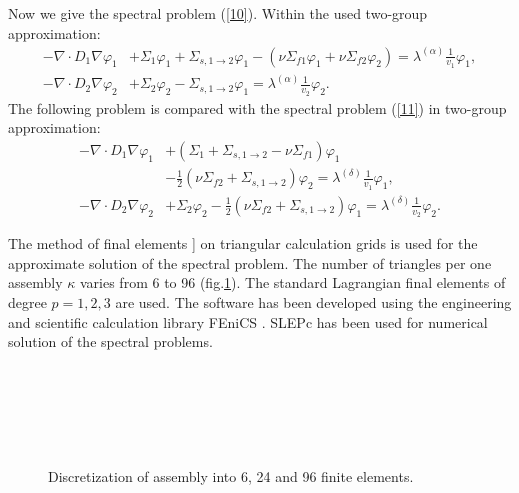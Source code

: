 \documentclass[authoryear]{elsarticle}
\begin{document}
Now we give the  spectral problem (\ref{10}). Within the used two-group approximation:
\begin{equation}\label{18}
\begin{split}
 - \nabla \cdot D_1 \nabla \varphi_1 & + \Sigma_1 \varphi_1 + \Sigma_{s,1\rightarrow 2} \varphi_1  
 - (\nu \Sigma_{f1} \varphi_1 + \nu \Sigma_{f2} \varphi_2) = \lambda^{(\alpha)} \frac{1}{v_1}   \varphi_1, \\
 - \nabla \cdot D_2 \nabla \varphi_2 & + \Sigma_2 \varphi_2 - \Sigma_{s,1\rightarrow 2} \varphi_1  
 = \lambda^{(\alpha)} \frac{1}{v_2}   \varphi_2.
\end{split}
\end{equation}
The following problem is compared with the spectral problem (\ref{11}) in two-group approximation:
\begin{equation}\label{19}
\begin{split}
 - \nabla \cdot D_1 \nabla \varphi_1 & + (\Sigma_1 + \Sigma_{s,1\rightarrow 2}  
 - \nu \Sigma_{f1}) \varphi_1 \\
 & - \frac{1}{2}  (\nu \Sigma_{f2} + \Sigma_{s,1\rightarrow 2}) \varphi_2  = \lambda^{(\delta)} \frac{1}{v_1}   \varphi_1, \\
 - \nabla \cdot D_2 \nabla \varphi_2 & + \Sigma_2 \varphi_2 
 - \frac{1}{2}  (\nu \Sigma_{f2} + \Sigma_{s,1\rightarrow 2}) \varphi_1 
 = \lambda^{(\delta )} \frac{1}{v_2}   \varphi_2.
\end{split}
\end{equation}

The method of final elements \cite{brenner,quarteroni} 
] on triangular calculation grids is used for the approximate solution of the spectral problem. The number of triangles per one assembly $\kappa$  varies from 6 to 96 (fig.\ref{fig:2}).
The standard Lagrangian final elements of degree $p=1,2,3$ are used.
The software has been developed using the engineering and scientific calculation library FEniCS \cite{fenics}. SLEPc \cite{hernandez2003resolution,hernandez2005slepc} has been used for numerical solution of the spectral problems. 

\begin{figure}[htp]
  \begin{center}
\begin{minipage}{0.30\linewidth}
\\
\end{minipage}
\hfill
\begin{minipage}{0.30\linewidth}
\\
\end{minipage}
\hfill
\begin{minipage}{0.30\linewidth}
\\
\end{minipage}
\caption{Discretization of assembly into 6, 24 and 96 finite elements.}
\label{fig:2}
  \end{center}
\end{figure}   
\end{document}
